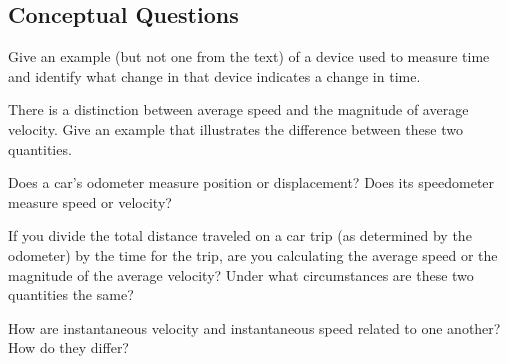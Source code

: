 \documentclass[
]{book}
\newenvironment{conceptual-questions}{}{}
\begin{document}
\hypertarget{fs-id3505230}{}
\begin{conceptual-questions}

\hypertarget{conceptual-questions-2}{%
\subsection{Conceptual Questions}\label{conceptual-questions-2}}

\hypertarget{fs-id4081795}{}
\leavevmode\hypertarget{fs-id4057370}{}%
Give an example (but not one from the text) of a device used to measure
time and identify what change in that device indicates a change in time.

\hypertarget{fs-id4059976}{}
\leavevmode\hypertarget{fs-id4059193}{}%
There is a distinction between average speed and the magnitude of
average velocity. Give an example that illustrates the difference
between these two quantities.

\hypertarget{fs-id3539434}{}
\leavevmode\hypertarget{fs-id1765012}{}%
Does a car's odometer measure position or displacement? Does its
speedometer measure speed or velocity?

\hypertarget{fs-id4033346}{}
\leavevmode\hypertarget{fs-id1181844}{}%
If you divide the total distance traveled on a car trip (as determined
by the odometer) by the time for the trip, are you calculating the
average speed or the magnitude of the average velocity? Under what
circumstances are these two quantities the same?

\hypertarget{fs-id1798382}{}
\leavevmode\hypertarget{fs-id3586650}{}%
How are instantaneous velocity and instantaneous speed related to one
another? How do they differ?

\end{conceptual-questions}
\end{document}
